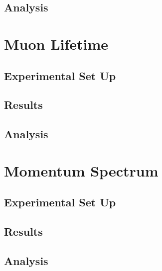 \section{Analysis} %
\label{sec:analysis}

\chapter{Muon Lifetime} %
\label{cha:muon_lifetime}
\section{Experimental Set Up} %
\label{sec:experimental_set_up}
\section{Results} %
\label{sec:results}

\section{Analysis} %
\label{sec:analysis}

\chapter{Momentum Spectrum} %
\label{cha:momentum_spectrum}
\section{Experimental Set Up} %
\label{sec:experimental_set_up}
\section{Results} %
\label{sec:results}

\section{Analysis} %
\label{sec:analysis}






















